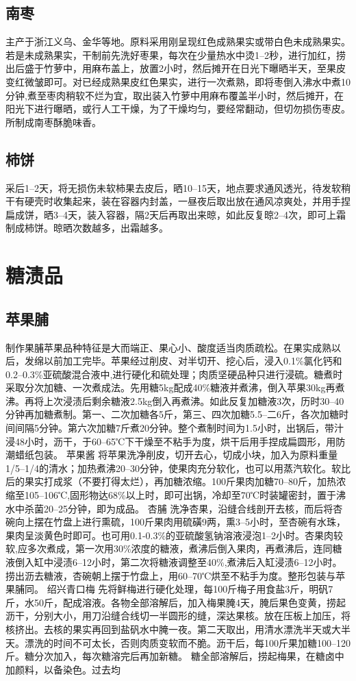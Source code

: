 \documentclass{ctexbook}
\begin{document}
\subsection{南枣}
主产于浙江义乌、金华等地。原料采用刚呈现红色成熟果实或带白色未成熟果实。若是未成熟果实，干制前先洗好枣果，每次在少量热水中烫1--2秒，进行加红，捞出后盛于竹萝中，用麻布盖上，放置2小时，然后摊开在日光下曝晒半天，至果皮变红微皱即可。对已经成熟果皮红色果实，进行一次煮熟，即将枣倒入沸水中煮10分钟,煮至枣肉稍软不烂为宜，取出装入竹萝中用麻布覆盖半小时，然后摊开，在阳光下进行曝晒，或行人工干燥，为了干燥均匀，要经常翻动，但切勿损伤枣皮。所制成南枣酥脆味香。
\subsection{柿饼}
采后1--2天，将无损伤未软柿果去皮后，晒10--15天，地点要求通风透光，待发软稍干有硬壳时收集起来，装在容器内封盖，一昼夜后取出放在通风凉爽处，并用手捏扁成饼，晒3--4天，装入容器，隔2天后再取出来晾，如此反复晾2--4次，即可上霜制成柿饼。晾晒次数越多，出霜越多。
\section{糖渍品}
\subsection{苹果脯}
制作果脯苹果品种特征是大而端正、果心小、酸度适当肉质疏松。在果实成熟以后，发绵以前加工完毕。苹果经过削皮、对半切开、挖心后，浸入0.1\%氯化钙和0.2--0.3\%亚硫酸混合液中,进行硬化和硫处理；肉质坚硬品种只进行浸硫。糖煮时采取分次加糖、一次煮成法。先用糖5kg配成40\%糖液并煮沸，倒入苹果30kg再煮沸。再将上次浸渍后剩余糖液2.5kg倒入再煮沸。如此反复加糖液3次，历时30--40分钟再加糖煮制。第一、二次加糖各5斤，第三、四次加糖5.5--二6斤，各次加糖时间间隔5分钟。第六次加糖7斤煮20分钟。整个煮制时间为1.5小时，出锅后，带汁浸48小时，沥干，于60--65℃下干燥至不粘手为度，烘干后用手捏成扁圆形，用防潮蜡纸包装。
苹果酱
将苹果洗净削皮，切开去心，切成小块，加入为原料重量1/5--1/4的清水；加热煮沸20--30分钟，使果肉充分软化，也可以用蒸汽软化。软比后的果实打成浆（不要打得太烂），再加糖浓缩。100斤果肉加糖70--80斤，加热浓缩至105--106℃,固形物达68\%以上时，即可出锅，冷却至70℃时装罐密封，置于沸水中杀菌20--25分钟，即为成品。
杏脯
洗净杏果，沿缝合线剖开去核，而后将杏碗向上摆在竹盘上进行熏硫，100斤果肉用硫磺9两，熏3--5小时，至杏碗有水珠，果肉呈淡黄色时即可。也可用0.1-0.3\%的亚硫酸氢钠溶液浸泡1--2小时。杏果肉较软,应多次煮成，第一次用30\%浓度的糖液，煮沸后倒入果肉，再煮沸后，连同糖液倒入缸中浸渍6--12小时，第二次将糖液调整至40\%,煮沸后入缸浸渍6--12小时。捞出沥去糖液，杏碗朝上摆于竹盘上，用60--70℃烘至不粘手为度。整形包装与苹果脯同。
绍兴青口梅
先将鲜梅进行硬化处理，每100斤梅子用食盐3斤，明矾7斤，水50斤，配成溶液。各物全部溶解后，加入梅果腌4天，腌后果色变黄，捞起沥干，分别大小，用刀沿缝合线切一半圆形的缝，深达果核。放在压板上加压，将核挤出。去核的果实再回到盐矾水中腌一夜。第二天取出，用清水漂洗半天或大半天。漂洗的时间不可太长，否则肉质变软而不脆。沥干后，每100斤果加糖100--120斤。糖分次加入，每次糖溶完后再加新糖。
糖全部溶解后，捞起梅果，在糖卤中加颜料，以备染色。过去均
\end{document}
